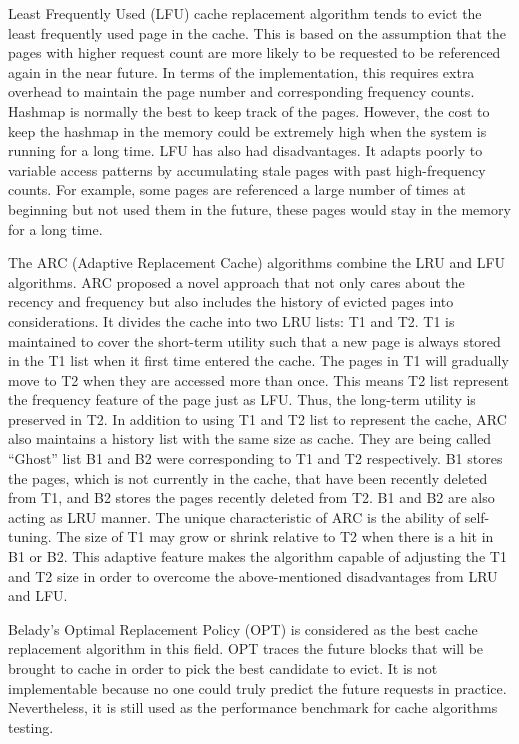 \documentclass[letterpaper,twocolumn,10pt]{article}
\begin{document}
Least Frequently Used (LFU) cache replacement algorithm tends to evict the least frequently used page in the cache. This is based on the assumption that the pages with higher request count are more likely to be requested to be referenced again in the near future\cite{coffman1973operating}. In terms of the implementation, this requires extra overhead to maintain the page number and corresponding frequency counts. Hashmap is normally the best to keep track of the pages. However, the cost to keep the hashmap in the memory could be extremely high when the system is running for a long time. LFU has also had disadvantages. It adapts poorly to variable access patterns by accumulating stale pages with past high-frequency counts. For example, some pages are referenced a large number of times at beginning but not used them in the future, these pages would stay in the memory for a long time. 

The ARC (Adaptive Replacement Cache) algorithms combine the LRU and LFU algorithms\cite{megiddo2003arc}. ARC proposed a novel approach that not only cares about the recency and frequency but also includes the history of evicted pages into considerations\cite{consuegra2015analyzing}. It divides the cache into two LRU lists: T1 and T2. T1 is maintained to cover the short-term utility such that a new page is always stored in the T1 list when it first time entered the cache. The pages in T1 will gradually move to T2 when they are accessed more than once. This means T2 list represent the frequency feature of the page just as LFU. Thus, the long-term utility is preserved in T2. In addition to using T1 and T2 list to represent the cache, ARC also maintains a history list with the same size as cache. They are being called “Ghost” list B1 and B2 were corresponding to T1 and T2 respectively. B1 stores the pages, which is not currently in the cache, that have been recently deleted from T1, and B2 stores the pages recently deleted from T2. B1 and B2 are also acting as LRU manner. The unique characteristic of ARC is the ability of self-tuning. The size of T1 may grow or shrink relative to T2 when there is a hit in B1 or B2. This adaptive feature makes the algorithm capable of adjusting the T1 and T2 size in order to overcome the above-mentioned disadvantages from LRU and LFU.

Belady’s Optimal Replacement Policy (OPT) is considered as the best cache replacement algorithm in this field\cite{belady1966study}\cite{mattson1970evaluation}. OPT traces the future blocks that will be brought to cache in order to pick the best candidate to evict. It is not implementable because no one could truly predict the future requests in practice. Nevertheless, it is still used as the performance benchmark for cache algorithms testing. 
\end{document}
